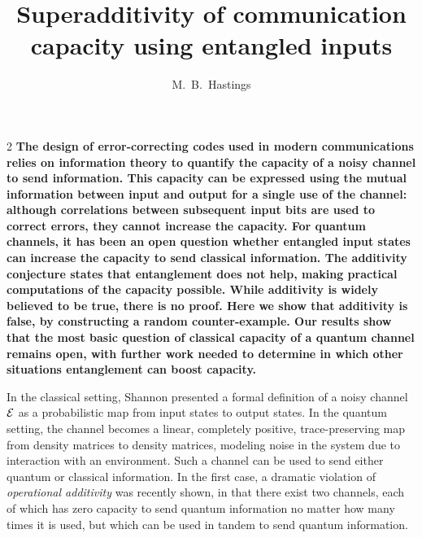 \documentclass[aps,prl,amsmath,amssymb,amsfonts,superscriptaddress,floatfix]{revtex4}
\begin{document}
\title{Superadditivity of communication capacity using entangled
inputs}
\author{M.~B.~Hastings}
\maketitle

\begin{multicols}{2}
{\bf
The design of error-correcting codes used in modern communications relies
on information theory to quantify the capacity of a noisy channel to send
information\cite{infthy}.  This capacity can be expressed using the mutual information
between input and output for a single use of the channel:
although correlations between
subsequent input bits are used to correct errors, they cannot increase the
capacity.  For quantum channels, it has been an open question whether
entangled input states can increase the capacity to send classical
information\cite{holevo}.  The additivity conjecture\cite{moec,equiv} states that entanglement
does not help, making practical computations of the capacity possible.
While additivity is widely believed to be true, there is no proof.  Here
we show that additivity is false, by constructing a random counter-example.
Our results show that the most basic question of classical capacity of a
quantum channel remains open, with further work needed to determine in
which other situations entanglement can boost capacity.}

In the classical setting, Shannon presented a formal definition of a noisy channel ${\cal E}$
as a probabilistic map from input states to output states.  In the quantum
setting, the channel becomes a linear, completely positive, trace-preserving
map from density matrices to
density matrices, modeling noise in the system due to interaction
with an environment.
Such a channel can be used to send either quantum or classical information.
In the first case, a dramatic violation
of {\it operational additivity} was recently shown, in that
there exist two channels, each of which has zero capacity to send
quantum information no matter how many times it is used, but which can be used in tandem to send quantum information\cite{jy}.


\end{multicols}
\end{document}
